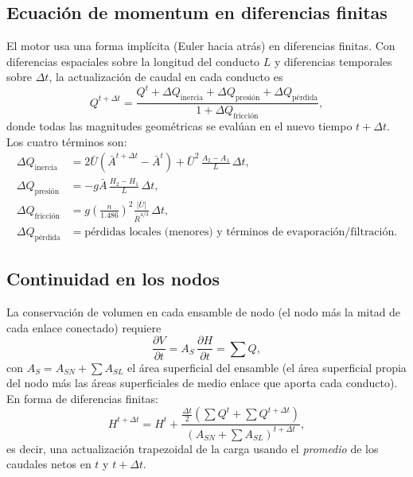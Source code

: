 \documentclass[11pt,a4paper]{article}
\begin{document}
\subsection{Ecuación de momentum en diferencias finitas}

El motor usa una forma implícita (Euler hacia atrás) en diferencias finitas.
Con diferencias espaciales sobre la longitud del conducto $L$ y diferencias
temporales sobre $\Delta t$, la actualización de caudal en cada conducto es
\begin{equation}
  Q^{t+\Delta t}
  = \frac{Q^{t} + \Delta Q_{\text{inercia}} + \Delta Q_{\text{presión}}
        + \Delta Q_{\text{pérdida}}}
         {1 + \Delta Q_{\text{fricción}}},
  \label{eq:mom-update}
\end{equation}
donde todas las magnitudes geométricas se evalúan en el nuevo tiempo
$t + \Delta t$. Los cuatro términos son:
\begin{align}
  \Delta Q_{\text{inercia}}
    &= 2\bar{U}\left(\bar{A}^{t+\Delta t} - \bar{A}^{t}\right)
       + \bar{U}^{2}\,\frac{A_2 - A_1}{L}\,\Delta t, \label{eq:mom-inertia}\\
  \Delta Q_{\text{presión}}
    &= -g\bar{A}\,\frac{H_2 - H_1}{L}\,\Delta t, \label{eq:mom-pressure}\\
  \Delta Q_{\text{fricción}}
    &= g\left(\frac{n}{1.486}\right)^{2}
       \frac{\lvert \bar{U} \rvert}{\bar{R}^{4/3}}\,\Delta t, \label{eq:mom-friction}\\
  \Delta Q_{\text{pérdida}}
    &= \text{pérdidas locales (menores) y términos de evaporación/filtración}.
\end{align}

\subsection{Continuidad en los nodos}

La conservación de volumen en cada ensamble de nodo (el nodo más la mitad de
cada enlace conectado) requiere
\begin{equation}
  \frac{\partial V}{\partial t}
  = A_{S}\,\frac{\partial H}{\partial t} = \sum Q,
\end{equation}
con $A_S = A_{SN} + \sum A_{SL}$ el área superficial del ensamble (el área
superficial propia del nodo más las áreas superficiales de medio enlace que
aporta cada conducto). En forma de diferencias finitas:
\begin{equation}
  H^{t+\Delta t} = H^{t} +
  \frac{\tfrac{\Delta t}{2}\left(\sum Q^{t} + \sum Q^{t+\Delta t}\right)}
       {\left(A_{SN} + \sum A_{SL}\right)^{t+\Delta t}},
\end{equation}
es decir, una actualización trapezoidal de la carga usando el \emph{promedio}
de los caudales netos en $t$ y $t+\Delta t$.
\end{document}
